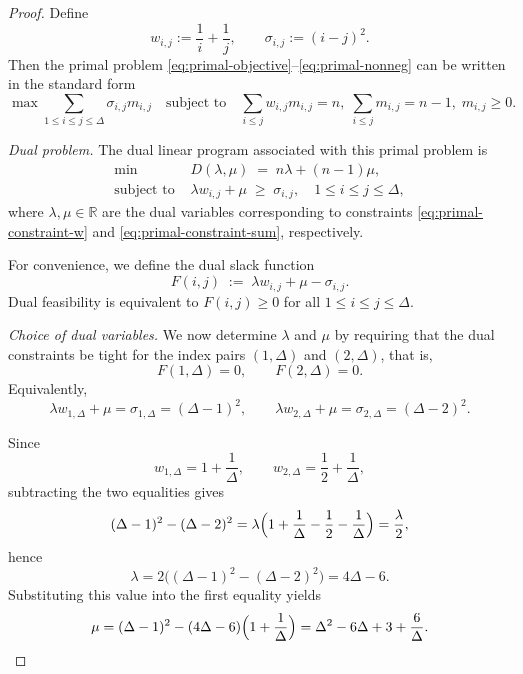 \documentclass[preprint,12pt]{elsarticle}
\begin{document}
\begin{proof}
Define
\[
w_{i,j} := \frac{1}{i}+\frac{1}{j},
\qquad
\sigma_{i,j} := (i-j)^2.
\]
Then the primal problem \eqref{eq:primal-objective}--\eqref{eq:primal-nonneg}
can be written in the standard form
\[
\max \sum_{1\le i\le j\le \Delta} \sigma_{i,j} m_{i,j}
\quad\text{subject to}\quad
\sum_{i\le j} w_{i,j} m_{i,j} = n,\;
\sum_{i\le j} m_{i,j} = n-1,\;
m_{i,j}\ge 0.
\]

\medskip\noindent
\emph{Dual problem.}
The dual linear program associated with this primal problem is
\begin{equation}
\label{eq:dual-problem}
\begin{aligned}
\min\ & D(\lambda,\mu) \;=\; n\lambda + (n-1)\mu,\\
\text{subject to }&
\lambda w_{i,j} + \mu \;\ge\; \sigma_{i,j},
\quad 1\le i\le j\le \Delta,
\end{aligned}
\end{equation}
where $\lambda,\mu\in\mathbb{R}$ are the dual variables corresponding to
constraints \eqref{eq:primal-constraint-w} and \eqref{eq:primal-constraint-sum},
respectively.

For convenience, we define the dual slack function
\begin{equation}
\label{eq:Fij-def}
F(i,j)
\;:=\;
\lambda w_{i,j} + \mu - \sigma_{i,j}.
\end{equation}
Dual feasibility is equivalent to $F(i,j)\ge 0$ for all $1\le i\le j\le \Delta$.

\medskip\noindent
\emph{Choice of dual variables.}
We now determine $\lambda$ and $\mu$ by requiring that the dual constraints
be tight for the index pairs $(1,\Delta)$ and $(2,\Delta)$, that is,
\begin{equation}
\label{eq:dual-equalities-1-2}
F(1,\Delta)=0,
\qquad
F(2,\Delta)=0.
\end{equation}
Equivalently,
\[
\lambda w_{1,\Delta} + \mu = \sigma_{1,\Delta} = (\Delta-1)^2,
\qquad
\lambda w_{2,\Delta} + \mu = \sigma_{2,\Delta} = (\Delta-2)^2.
\]

Since
\[
w_{1,\Delta} = 1+\frac{1}{\Delta},
\qquad
w_{2,\Delta} = \frac12+\frac{1}{\Delta},
\]
subtracting the two equalities gives
\[
(\Delta-1)^2 - (\Delta-2)^2
=
\lambda\Bigl(1+\frac{1}{\Delta}-\frac12-\frac{1}{\Delta}\Bigr)
=
\frac{\lambda}{2},
\]
hence
\begin{equation}
\label{eq:lambda}
\lambda
=
2\bigl((\Delta-1)^2-(\Delta-2)^2\bigr)
=
4\Delta-6.
\end{equation}
Substituting this value into the first equality yields
\begin{equation}
\label{eq:mu}
\mu
=
(\Delta-1)^2 - (4\Delta-6)\Bigl(1+\frac{1}{\Delta}\Bigr)
=
\Delta^2 - 6\Delta + 3 + \frac{6}{\Delta}.
\end{equation}


\end{proof}
\end{document}
